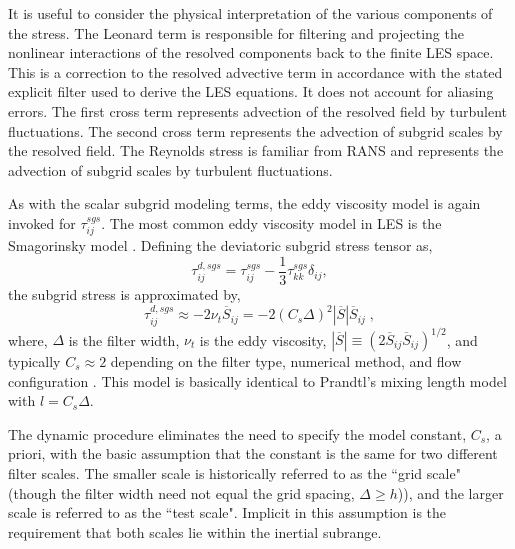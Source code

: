 It is useful to consider the physical interpretation of the various components of the stress. The Leonard term is responsible for filtering and projecting the nonlinear interactions of the resolved components back to the finite LES space.  This is a correction to the resolved advective term in accordance with the stated explicit filter used to derive the LES equations. It does not account for aliasing errors. The first cross term represents advection of the resolved field by turbulent fluctuations. The second cross term represents the advection of subgrid scales by the resolved field. The Reynolds stress is familiar from RANS and represents the advection of subgrid scales by turbulent fluctuations. 

As with the scalar subgrid modeling terms, the eddy viscosity model is again invoked for $\tau^{sgs}_{ij}$.  The most common eddy viscosity model in LES is the Smagorinsky model \cite{Smagorinsky178}.  Defining the deviatoric subgrid stress tensor as, 
\begin{equation}
\tau^{d, sgs}_{ij} = \tau^{sgs}_{ij} - \frac{1}{3}\tau^{sgs}_{kk} \delta_{ij}, 
\end{equation}
the subgrid stress is approximated by,
\begin{equation}
\tau_{ij}^{d, sgs} \approx -2 \nu_t \overline{S}_{ij} = -2 (C_s \Delta)^2 |\overline{S}|\overline{S}_{ij} \; , 
\end{equation}
where, $\Delta$ is the filter width, $\nu_t$ is the eddy viscosity, $|\overline{S}| \equiv (2\overline{S}_{ij}\overline{S}_{ij})^{1/2}$, and typically $C_s \approx 2$  depending on the filter type, numerical method, and flow configuration \cite{Pope179}. This model is basically identical to Prandtl's mixing length model with $l = C_s \Delta$.

The dynamic procedure \cite{Germano74, Moin158} eliminates the need to specify the model constant, $C_s$, a priori, with the basic assumption that the constant is the same for two different filter scales. The smaller scale is historically referred to as the ``grid scale" (though the filter width need not equal the grid spacing, $\Delta \geq h$)), and the larger scale is referred to as the ``test scale".  Implicit in this assumption is the requirement that both scales lie within the inertial subrange. 

